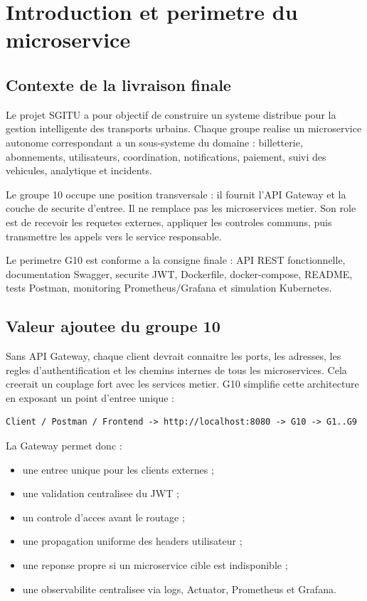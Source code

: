 \documentclass[12pt,a4paper]{article}
\begin{document}
\tableofcontents
\newpage

\section{Introduction et perimetre du microservice}

\subsection{Contexte de la livraison finale}

Le projet SGITU a pour objectif de construire un systeme distribue pour la gestion intelligente des transports urbains. Chaque groupe realise un microservice autonome correspondant a un sous-systeme du domaine : billetterie, abonnements, utilisateurs, coordination, notifications, paiement, suivi des vehicules, analytique et incidents.

Le groupe 10 occupe une position transversale : il fournit l'API Gateway et la couche de securite d'entree. Il ne remplace pas les microservices metier. Son role est de recevoir les requetes externes, appliquer les controles communs, puis transmettre les appels vers le service responsable.

\begin{successBox}
Le perimetre G10 est conforme a la consigne finale : API REST fonctionnelle, documentation Swagger, securite JWT, Dockerfile, docker-compose, README, tests Postman, monitoring Prometheus/Grafana et simulation Kubernetes.
\end{successBox}

\subsection{Valeur ajoutee du groupe 10}

Sans API Gateway, chaque client devrait connaitre les ports, les adresses, les regles d'authentification et les chemins internes de tous les microservices. Cela creerait un couplage fort avec les services metier. G10 simplifie cette architecture en exposant un point d'entree unique :

\begin{lstlisting}[style=code]
Client / Postman / Frontend -> http://localhost:8080 -> G10 -> G1..G9
\end{lstlisting}

La Gateway permet donc :

\begin{itemize}
  \item une entree unique pour les clients externes ;
  \item une validation centralisee du JWT ;
  \item un controle d'acces avant le routage ;
  \item une propagation uniforme des headers utilisateur ;
  \item une reponse propre si un microservice cible est indisponible ;
  \item une observabilite centralisee via logs, Actuator, Prometheus et Grafana.
\end{itemize}
\end{document}
